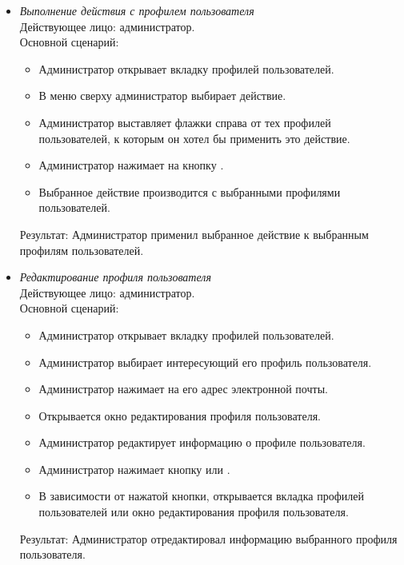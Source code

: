 \begin{itemize}[topsep=0pt, parsep=0pt, itemsep=0pt, leftmargin=*, labelindent=0.5cm]
	\item \textit{Выполнение действия с профилем пользователя} \\
	Действующее лицо: администратор. \\
	Основной сценарий:
	\begin{itemize}[topsep=0pt, parsep=0pt, itemsep=0pt, leftmargin=*, labelindent=0.5cm]
		\item Администратор открывает вкладку профилей пользователей.
		\item В меню сверху администратор выбирает действие.
		\item Администратор выставляет флажки справа от тех профилей пользователей, к которым он хотел бы применить это действие.
		\item Администратор нажимает на кнопку .
		\item Выбранное действие производится с выбранными профилями пользователей.
	\end{itemize}
	Результат: Администратор применил выбранное действие к выбранным профилям пользователей.
\end{itemize}

\begin{itemize}[topsep=0pt, parsep=0pt, itemsep=0pt, leftmargin=*, labelindent=0.5cm]
	\item \textit{Редактирование профиля пользователя} \\
	Действующее лицо: администратор. \\
	Основной сценарий:
	\begin{itemize}[topsep=0pt, parsep=0pt, itemsep=0pt, leftmargin=*, labelindent=0.5cm]
		\item Администратор открывает вкладку профилей пользователей.
		\item Администратор выбирает интересующий его профиль пользователя.
		\item Администратор нажимает на его адрес электронной почты.
		\item Открывается окно редактирования профиля пользователя.
		\item Администратор редактирует информацию о профиле пользователя.
		\item Администратор нажимает кнопку  или .
		\item В зависимости от нажатой кнопки, открывается вкладка профилей пользователей или окно редактирования профиля пользователя.
	\end{itemize}
	Результат: Администратор отредактировал информацию выбранного профиля пользователя.
\end{itemize}

